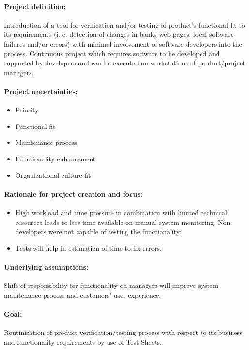 \paragraph{Project definition:} Introduction of a tool for verification and/or testing of product’s functional fit to its requirements (i. e. detection of changes in banks web-pages, local software failures and/or errors) with minimal involvement of software developers into the process. Continuous project which requires software to be developed and supported by developers and can be executed on workstations of product/project managers.

\paragraph{Project uncertainties:}
\begin{itemize}
	\item Priority
	\item Functional fit
	\item Maintenance process
	\item Functionality enhancement
	\item Organizational culture fit
\end{itemize}

\paragraph{Rationale for project creation and focus:} 
\begin{itemize}
	\item High workload and time pressure in combination with limited technical resources leads to less time available on manual system monitoring. Non developers were not capable of testing the functionality;
	\item Tests will help in estimation of time to fix errors.
\end{itemize}


\paragraph{Underlying assumptions:} Shift of responsibility for functionality  on managers will improve system maintenance process and customers' user experience. 

\paragraph{Goal:} Routinization of product verification/testing process with respect to its business and functionality requirements by use of Test Sheets.
